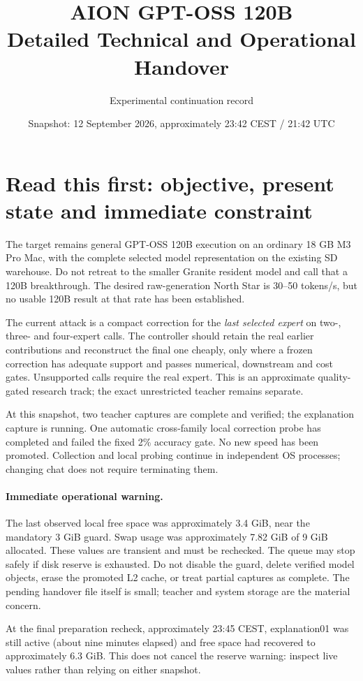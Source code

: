 \documentclass[11pt,a4paper]{article}
\title{AION GPT-OSS 120B\\Detailed Technical and Operational Handover}
\author{Experimental continuation record}
\date{Snapshot: 12 September 2026, approximately 23:42 CEST / 21:42 UTC}
\begin{document}
\maketitle
\tableofcontents
\newpage

\section{Read this first: objective, present state and immediate constraint}
The target remains general GPT-OSS 120B execution on an ordinary 18 GB
M3 Pro Mac, with the complete selected model representation on the existing
SD warehouse. Do not retreat to the smaller Granite resident model and call
that a 120B breakthrough. The desired raw-generation North Star is 30--50
tokens/s, but no usable 120B result at that rate has been established.

The current attack is a compact correction for the \emph{last selected expert}
on two-, three- and four-expert calls. The controller should retain the real
earlier contributions and reconstruct the final one cheaply, only where a
frozen correction has adequate support and passes numerical, downstream and
cost gates. Unsupported calls require the real expert. This is an approximate
quality-gated research track; the exact unrestricted teacher remains separate.

At this snapshot, two teacher captures are complete and verified; the
explanation capture is running. One automatic cross-family local correction
probe has completed and failed the fixed 2\% accuracy gate. No new speed has
been promoted. Collection and local probing continue in independent OS
processes; changing chat does not require terminating them.

\paragraph{Immediate operational warning.}
The last observed local free space was approximately 3.4 GiB, near the
mandatory 3 GiB guard. Swap usage was approximately 7.82 GiB of 9 GiB allocated.
These values are transient and must be rechecked. The queue may stop safely
if disk reserve is exhausted. Do not disable the guard, delete verified model
objects, erase the promoted L2 cache, or treat partial captures as complete.
The pending handover file itself is small; teacher and system storage are the
material concern.

At the final preparation recheck, approximately 23:45 CEST, explanation01 was
still active (about nine minutes elapsed) and free space had recovered to
approximately 6.3 GiB. This does not cancel the reserve warning: inspect live
values rather than relying on either snapshot.
\end{document}
